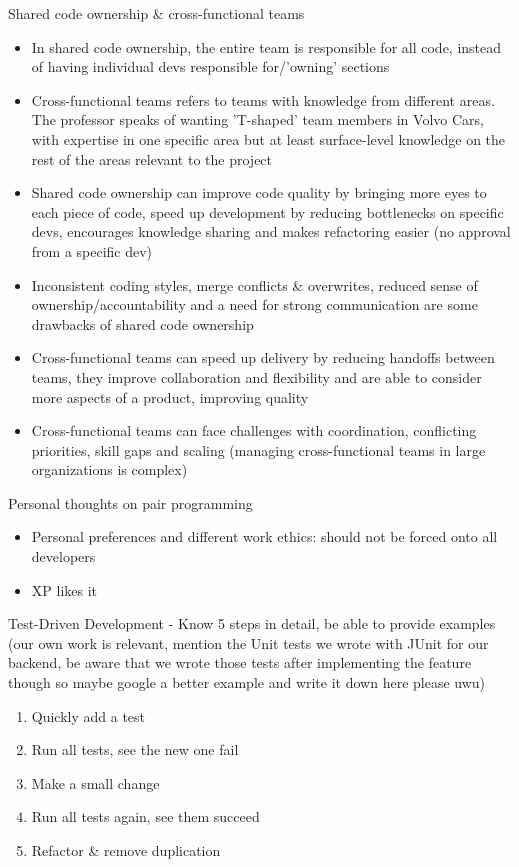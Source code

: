 \documentclass[10pt]{article}
\begin{document}
Shared code ownership \& cross-functional teams
\begin{itemize}
\item In shared code ownership, the entire team is responsible for all code, instead of having individual devs responsible for/'owning' sections
\item Cross-functional teams refers to teams with knowledge from different areas. The professor speaks of wanting 'T-shaped' team members in Volvo Cars, with expertise in one specific area but at least surface-level knowledge on the rest of the areas relevant to the project
\end{itemize}
\begin{itemize}
\item Shared code ownership can improve code quality by bringing more eyes to each piece of code, speed up development by reducing bottlenecks on specific devs, encourages knowledge sharing and makes refactoring easier (no approval from a specific dev)
\item Inconsistent coding styles, merge conflicts \& overwrites, reduced sense of ownership/accountability and a need for strong communication are some drawbacks of shared code ownership
\item Cross-functional teams can speed up delivery by reducing handoffs between teams, they improve collaboration and flexibility and are able to consider more aspects of a product, improving quality
\item Cross-functional teams can face challenges with coordination, conflicting priorities, skill gaps and scaling (managing cross-functional teams in large organizations is complex)
\end{itemize}
Personal thoughts on pair programming
\begin{itemize}
\item Personal preferences and different work ethics: should not be forced onto all developers 
\item XP likes it
\end{itemize}
Test-Driven Development - Know 5 steps in detail, be able to provide examples (our own work is relevant, mention the Unit tests we wrote with JUnit for our backend, be aware that we wrote those tests after implementing the feature though so maybe google a better example and write it down here please uwu)
\begin{enumerate}
\item Quickly add a test
\item Run all tests, see the new one fail
\item Make a small change
\item Run all tests again, see them succeed
\item Refactor \& remove duplication
\end{enumerate}
\end{document}
